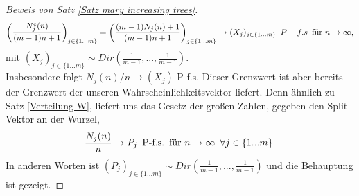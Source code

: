 \begin{proof}[Beweis von Satz \ref{Satz mary increasing trees}]
    \[
        \left(\frac{N^{e}_j(n)}{(m-1)n+1}\right)_{j \in \{1...m\}} = \left(\frac{(m-1)N_j(n) + 1}{(m-1)n+1}\right)_{j \in \{1...m\}} \rightarrow (X_j)_{j \in \{ 1...m\}} \hspace*{5pt} P-f.s \hspace*{5pt} \textnormal{für } n \to \infty,
    \]
    mit $(X_j)_{j \in \{1...m\}} \sim Dir(\frac{1}{m-1},...,\frac{1}{m-1})$. \\
    Insbesondere folgt $N_j(n)/n \to (X_j)$ P-f.s. Dieser Grenzwert ist aber bereits der Grenzwert der unseren Wahrscheinlichkeitsvektor liefert. Denn ähnlich zu Satz \ref{Verteilung W}, liefert uns das Gesetz der großen Zahlen, gegeben den Split Vektor an der Wurzel,
    \[
        \frac{N_j(n)}{n} \rightarrow P_j \hspace{5pt} \textnormal{P-f.s.} \hspace*{5pt} \textnormal{für } n \to \infty \hspace*{5pt} \forall j \in \{1...m\}.
    \]
    In anderen Worten ist $(P_j)_{j \in \{1...m\}} \sim Dir(\frac{1}{m-1},...,\frac{1}{m-1})$ und die Behauptung ist gezeigt.

\end{proof}
